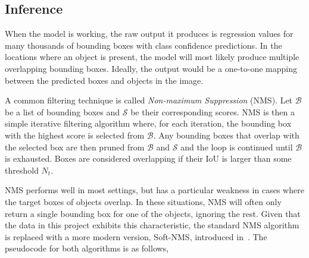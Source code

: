 \subsection{Inference}

When the model is working, the raw output it produces is regression values for many thousands of bounding boxes with class confidence predictions.
In the locations where an object is present, the model will most likely produce multiple overlapping bounding boxes.
Ideally, the output would be a one-to-one mapping between the predicted boxes and objects in the image.

A common filtering technique is called \textit{Non-maximum Suppression} (NMS).
Let \( \mathcal{B} \) be a list of bounding boxes and \( \mathcal{S} \) be their corresponding scores.
NMS is then a simple iterative filtering algorithm where, for each iteration, the bounding box with the highest score is selected from \(\mathcal{B}\).
Any bounding boxes that overlap with the selected box are then pruned from \(\mathcal{B}\) and \(\mathcal{S}\) and the loop is continued until \(\mathcal{B}\) is exhausted.
Boxes are considered overlapping if their IoU is larger than some threshold \(N_t\).

NMS performs well in most settings, but has a particular weakness in cases where the target boxes of objects overlap.
In these situations, NMS will often only return a single bounding box for one of the objects, ignoring the rest.
Given that the data in this project exhibits this characteristic, the standard NMS algorithm is replaced with a more modern version, Soft-NMS, introduced in\ \textcite{bodla2017softnms}.
The pseudocode for both algorithms is as follows,

